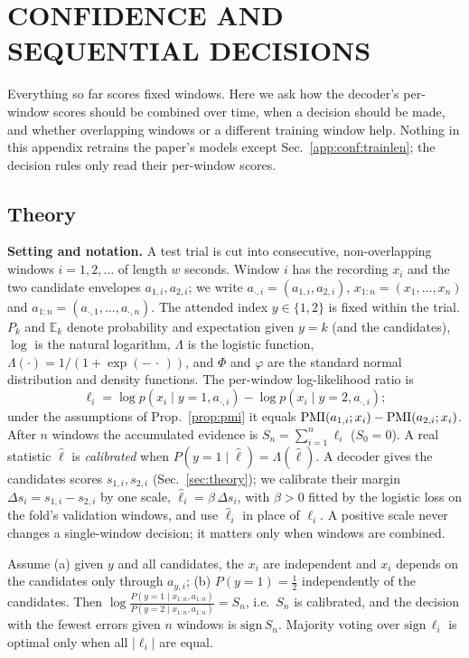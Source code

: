\section{CONFIDENCE AND SEQUENTIAL DECISIONS}\label{app:conf}
Everything so far scores fixed windows. Here we ask how the decoder's per-window scores should
be combined over time, when a decision should be made, and whether overlapping windows or a
different training window help. Nothing in this appendix retrains the paper's models except
Sec.~\ref{app:conf:trainlen}; the decision rules only read their per-window scores.

\subsection{Theory}\label{app:conf:theory}
\textbf{Setting and notation.} A test trial is cut into consecutive, non-overlapping
windows $i=1,2,\dots$ of length $w$ seconds. Window $i$ has the recording $x_i$ and the two
candidate envelopes $a_{1,i},a_{2,i}$; we write $a_{\cdot,i}=(a_{1,i},a_{2,i})$,
$x_{1:n}=(x_1,\dots,x_n)$ and $a_{1:n}=(a_{\cdot,1},\dots,a_{\cdot,n})$. The attended index
$y\in\{1,2\}$ is fixed within the trial. $P_k$ and $\mathbb E_k$ denote probability and
expectation given $y=k$ (and the candidates), $\log$ is the natural logarithm,
$\Lambda$ is the logistic function, $\Lambda(\cdot)=1/(1+\exp(-\,\cdot\,))$, and $\Phi$ and $\varphi$ are the standard
normal distribution and density functions. The per-window log-likelihood ratio is
\[\ell_i=\log p(x_i\mid y{=}1,a_{\cdot,i})-\log p(x_i\mid y{=}2,a_{\cdot,i});\]
under the assumptions of Prop.~\ref{prop:pmi} it equals $\mathrm{PMI}(a_{1,i};x_i)-\mathrm{PMI}(a_{2,i};x_i)$.
After $n$ windows the accumulated evidence is $S_n=\sum_{i=1}^n\ell_i$ ($S_0=0$). A real
statistic $\hat\ell$ is \emph{calibrated} when $P(y{=}1\mid\hat\ell)=\Lambda(\hat\ell)$. A decoder gives the
candidates scores $s_{1,i},s_{2,i}$ (Sec.~\ref{sec:theory}); we calibrate their margin
$\Delta s_i=s_{1,i}-s_{2,i}$ by one scale, $\hat\ell_i=\beta\,\Delta s_i$, with $\beta>0$ fitted by the
logistic loss on the fold's validation windows, and use $\hat\ell_i$ in place of $\ell_i$. A
positive scale never changes a single-window decision; it matters only when windows are
combined.

\begin{proposition}\label{prop:add}
Assume (a) given $y$ and all candidates, the $x_i$ are independent and $x_i$ depends on the
candidates only through $a_{y,i}$; (b) $P(y{=}1)=\tfrac12$ independently of the candidates.
Then $\log\frac{P(y=1\mid x_{1:n},a_{1:n})}{P(y=2\mid x_{1:n},a_{1:n})}=S_n$, i.e.\ $S_n$ is
calibrated, and the decision with the fewest errors given $n$ windows is $\mathrm{sign}\,S_n$. Majority
voting over $\mathrm{sign}\,\ell_i$ is optimal only when all $|\ell_i|$ are equal.
\end{proposition}

